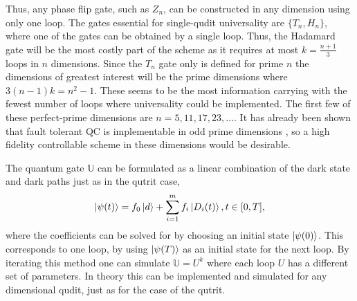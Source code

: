 Thus, any phase flip gate, such as $Z_n$, can be constructed in any dimension using only one loop. The gates essential for single-qudit universality are $\{T_n, H_n\}$, where one of the gates can be obtained by a single loop. Thus, the Hadamard gate will be the most costly part of the scheme as it requires at most $k = \frac{n+1}{3}$ loops in $n$ dimensions. Since the $T_n$ gate only is defined for prime $n$ the dimensions of greatest interest will be the prime dimensions where $3(n-1)k = n^2 -1$. These seems to be the most information carrying with the fewest number of loops where universality could be implemented. The first few of these perfect-prime dimensions are $n = 5,11,17,23,\dots$. It has already been shown that fault tolerant QC is implementable in odd prime dimensions \cite{magic-muller}, so a high fidelity controllable scheme in these dimensions would be desirable.



The quantum gate $\mathbb{U}$ can be formulated as a linear combination of the dark state and dark paths just as in the qutrit case,
\begin{equation}
\ket{\psi(t)} = f_0\ket{d} + \sum_{i = 1}^{m}f_i\ket{D_i(t)}, t \in [0,T],
\end{equation}
where the coefficients can be solved for by choosing an initial state $\ket{\psi(0)}$. This corresponds to one loop, by using $\ket{\psi(T)}$ as an initial state for the next loop. By iterating this method one can simulate $\mathbb{U} = U^k$ where each loop $U$ has a different set of parameters. In theory this can be implemented and simulated for any dimensional qudit, just as for the case of the qutrit. 






